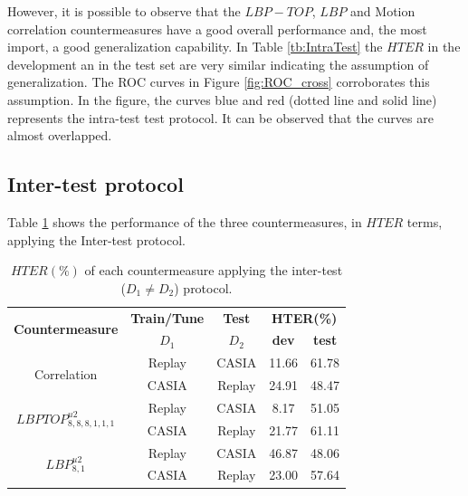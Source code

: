 However, it is possible to observe that the $LBP-TOP$, $LBP$ and Motion correlation countermeasures have a good overall performance and, the most import, a good generalization capability. In Table \ref{tb:IntraTest} the $HTER$ in the development an in the test set are very similar indicating the assumption of generalization. The ROC curves in Figure \ref{fig:ROC_cross} corroborates this assumption. In the figure, the curves blue and red (dotted line and solid line) represents the intra-test test protocol. It can be observed that the curves are almost overlapped.

\subsection{Inter-test protocol}
\label{sec:Inter_test}

Table \ref{tb:InterTest} shows the performance of the three countermeasures, in $HTER$ terms, applying the Inter-test protocol.

\hspace{-17mm}\begin{table}[ht!]
\caption{$HTER(\%)$ of each countermeasure applying the inter-test ($D_1 \neq D_2$) protocol.}
\begin{center}
  \begin{tabular}{ | c | c | c | c  c | }
    \hline

   \multirow{2}{*}{\textbf{Countermeasure}} & \textbf{Train/Tune} & \textbf{Test} & \multicolumn{2}{c|}{\textbf{HTER(\%)}} \\ 
     & $D_1$ & $D_2$ & \textbf{dev} & \textbf{test}  \\ \hline
    
    \multirow{2}{*}{Correlation} &  Replay & CASIA & 11.66 & 61.78  \\ 
               & CASIA  & Replay & 24.91 & 48.47  \\ \hline \hline

    \multirow{2}{*}{$LBPTOP_{8,8,8,1,1,1}^{u2}$}  &  Replay  & CASIA  & 8.17 & 51.05   \\
               & CASIA  & Replay & 21.77 & 61.11   \\ \hline \hline

    \multirow{2}{*}{$LBP_{8,1}^{u2}$} &  Replay  & CASIA  & 46.87  & 48.06   \\
               & CASIA  & Replay & 23.00 & 57.64  \\
            
    \hline
  \end{tabular}
\end{center}
\label{tb:InterTest}
\end{table}

